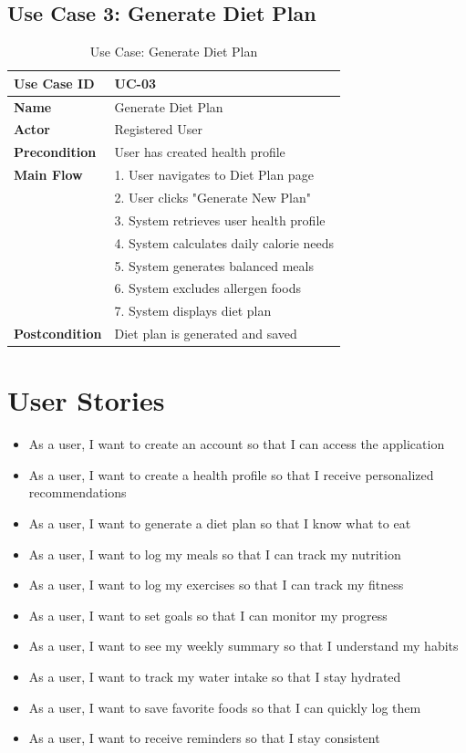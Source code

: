 \subsection{Use Case 3: Generate Diet Plan}

\begin{table}[H]
\centering
\begin{tabular}{|l|p{10cm}|}
\hline
\textbf{Use Case ID} & UC-03 \\
\hline
\textbf{Name} & Generate Diet Plan \\
\hline
\textbf{Actor} & Registered User \\
\hline
\textbf{Precondition} & User has created health profile \\
\hline
\textbf{Main Flow} & 
1. User navigates to Diet Plan page \\
& 2. User clicks "Generate New Plan" \\
& 3. System retrieves user health profile \\
& 4. System calculates daily calorie needs \\
& 5. System generates balanced meals \\
& 6. System excludes allergen foods \\
& 7. System displays diet plan \\
\hline
\textbf{Postcondition} & Diet plan is generated and saved \\
\hline
\end{tabular}
\caption{Use Case: Generate Diet Plan}
\end{table}

\section{User Stories}

\begin{itemize}
    \item As a user, I want to create an account so that I can access the application
    \item As a user, I want to create a health profile so that I receive personalized recommendations
    \item As a user, I want to generate a diet plan so that I know what to eat
    \item As a user, I want to log my meals so that I can track my nutrition
    \item As a user, I want to log my exercises so that I can track my fitness
    \item As a user, I want to set goals so that I can monitor my progress
    \item As a user, I want to see my weekly summary so that I understand my habits
    \item As a user, I want to track my water intake so that I stay hydrated
    \item As a user, I want to save favorite foods so that I can quickly log them
    \item As a user, I want to receive reminders so that I stay consistent
\end{itemize}
